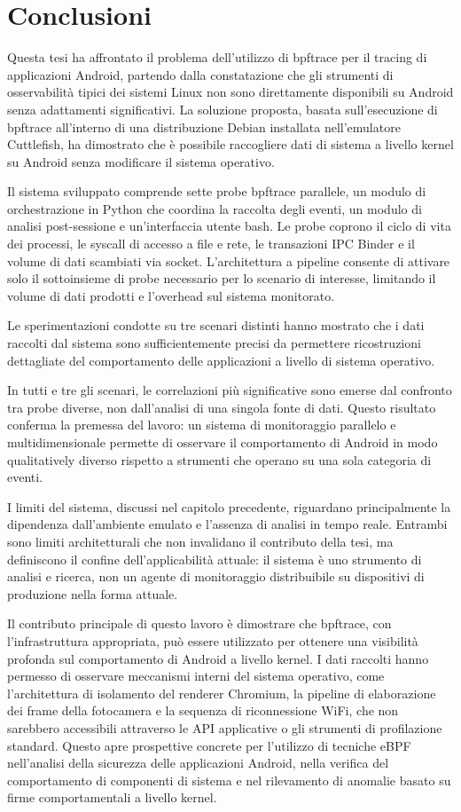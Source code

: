 \chapter{Conclusioni}

Questa tesi ha affrontato il problema dell'utilizzo di bpftrace per il tracing di applicazioni Android, partendo dalla constatazione che gli strumenti di osservabilità tipici dei sistemi Linux non sono direttamente disponibili su Android senza adattamenti significativi. La soluzione proposta, basata sull'esecuzione di bpftrace all'interno di una distribuzione Debian installata nell'emulatore Cuttlefish, ha dimostrato che è possibile raccogliere dati di sistema a livello kernel su Android senza modificare il sistema operativo.

Il sistema sviluppato comprende sette probe bpftrace parallele, un modulo di orchestrazione in Python che coordina la raccolta degli eventi, un modulo di analisi post-sessione e un'interfaccia utente bash. Le probe coprono il ciclo di vita dei processi, le syscall di accesso a file e rete, le transazioni IPC Binder e il volume di dati scambiati via socket. L'architettura a pipeline consente di attivare solo il sottoinsieme di probe necessario per lo scenario di interesse, limitando il volume di dati prodotti e l'overhead sul sistema monitorato.

Le sperimentazioni condotte su tre scenari distinti hanno mostrato che i dati raccolti dal sistema sono sufficientemente precisi da permettere ricostruzioni dettagliate del comportamento delle applicazioni a livello di sistema operativo.

In tutti e tre gli scenari, le correlazioni più significative sono emerse dal confronto tra probe diverse, non dall'analisi di una singola fonte di dati. Questo risultato conferma la premessa del lavoro: un sistema di monitoraggio parallelo e multidimensionale permette di osservare il comportamento di Android in modo qualitatively diverso rispetto a strumenti che operano su una sola categoria di eventi.

I limiti del sistema, discussi nel capitolo precedente, riguardano principalmente la dipendenza dall'ambiente emulato e l'assenza di analisi in tempo reale. Entrambi sono limiti architetturali che non invalidano il contributo della tesi, ma definiscono il confine dell'applicabilità attuale: il sistema è uno strumento di analisi e ricerca, non un agente di monitoraggio distribuibile su dispositivi di produzione nella forma attuale.

Il contributo principale di questo lavoro è dimostrare che bpftrace, con l'infrastruttura appropriata, può essere utilizzato per ottenere una visibilità profonda sul comportamento di Android a livello kernel. I dati raccolti hanno permesso di osservare meccanismi interni del sistema operativo, come l'architettura di isolamento del renderer Chromium, la pipeline di elaborazione dei frame della fotocamera e la sequenza di riconnessione WiFi, che non sarebbero accessibili attraverso le API applicative o gli strumenti di profilazione standard. Questo apre prospettive concrete per l'utilizzo di tecniche eBPF nell'analisi della sicurezza delle applicazioni Android, nella verifica del comportamento di componenti di sistema e nel rilevamento di anomalie basato su firme comportamentali a livello kernel.
